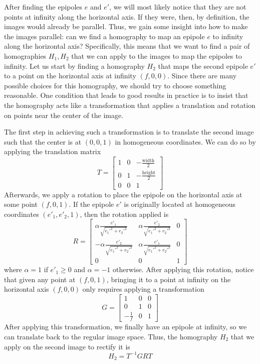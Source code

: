 \documentclass[a4paper, 12pt]{article}
\begin{document}
After finding the epipoles $e$ and $e'$, we will most likely notice that they are not points at infinity along the horizontal axis. If they were, then, by definition, the images would already be parallel. Thus, we gain some insight into how to make the images parallel: can we find a homography to map an epipole $e$ to infinity along the horizontal axis? Specifically, this means that we want to find a pair of homographies $H_1, H_2$ that we can apply to the images to map the epipoles to infinity. Let us start by finding a homography $H_2$ that maps the second epipole $e'$ to a  point on the horizontal axis at infinity $(f,0,0)$. Since there are many possible choices for this homography, we should try to choose something reasonable. One condition that leads to good results in practice is to insist that the homography acts like a transformation that applies a translation and rotation on points near the center of the image. 

The first step in achieving such a transformation is to translate the second image such that the center is at $(0,0,1)$ in homogeneous coordinates. We can do so by applying the translation matrix
\begin{equation}
    T = \begin{bmatrix}
    1&0&-\frac{\mathrm{width}}{2}\\0&1&-\frac{\mathrm{height}}{2}\\ 0 &0 &1
    \end{bmatrix}
\end{equation}
Afterwards, we apply a rotation to place the epipole on the horizontal axis at some point $(f,0,1)$. If the epipole $e'$ is originally located at homogeneous coordinates $(e'_1, e'_2, 1)$, then the rotation applied is
\begin{equation}
    R = 
    \begin{bmatrix}
        \alpha\frac{e'_1}{\sqrt{e_1'^2+e_2'^2}} & \alpha\frac{e'_2}{\sqrt{e_1'^2+e_2'^2}} & 0 \\ -\alpha\frac{e'_2}{\sqrt{e_1'^2+e_2'^2}} &\alpha \frac{e'_1}{\sqrt{e_1'^2+e_2'^2}} & 0\\ 0&0&1
    \end{bmatrix}
\end{equation}
where $\alpha=1$ if $e'_1\geq 0$ and $\alpha=-1$ otherwise. After applying this rotation, notice that given any point at $(f,0,1)$, bringing it to a point at infinity on the horizontal axis $(f,0,0)$ only requires applying a transformation
\begin{equation}
    G =
    \begin{bmatrix}
    1 & 0 &0 \\ 0 & 1 & 0 \\ -\frac{1}{f} & 0 & 1
    \end{bmatrix}
\end{equation}
After applying this transformation, we finally have an epipole at infinity, so we can translate back to the regular image space. Thus, the homography $H_2$ that we apply on the second image to rectify it is 
\begin{equation}
    H_2 = T^{-1}GRT 
\end{equation}
\end{document}
